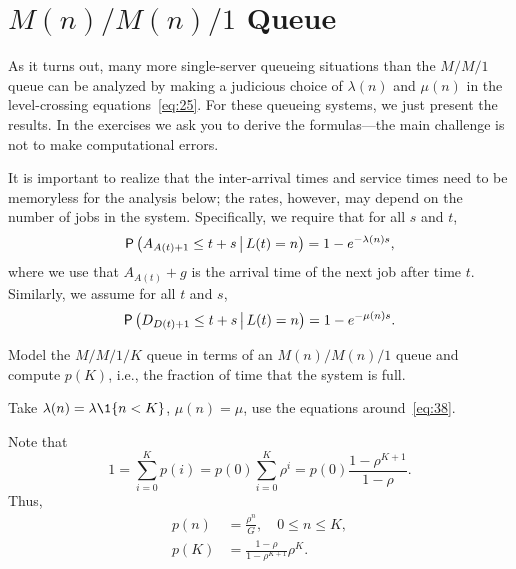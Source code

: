 \section
{$M(n)/M(n)/1$ Queue}
\label{sec:mnmn1}



As it turns out, many more single-server queueing situations than the $M/M/1$ queue can be analyzed by making a judicious choice of $\lambda(n)$ and $\mu(n)$ in the level-crossing equations~\cref{eq:25}.
For these queueing systems, we just present the results.
In the exercises we ask you to derive the formulas---the main challenge is not to make computational errors.

It is important to realize that the inter-arrival times and service times need to be memoryless for the analysis below; the rates, however, may depend on the number of jobs in the system. Specifically, we require that for all $s$ and $t$,
\begin{equation*}
 \P{A_{A(t)+1} \leq t+s \given L(t) = n} = 1-e^{-\lambda(n) s},
\end{equation*}
where we use that $A_{A(t)}+g$ is the arrival time of the next job after time $t$.
Similarly, we assume for all $t$ and $s$,
\begin{equation*}
 \P{D_{D(t)+1} \leq t+s \given L(t)=n} = 1-e^{-\mu(n) s}.
\end{equation*}


\begin{exercise}
 Model the $M/M/1/K$ queue in terms of an $M(n)/M(n)/1$ queue and compute $p(K)$, i.e., the fraction of time that the system is full.
\begin{hint}
 Take $\lambda(n) = \lambda \1{n < K}$, $\mu(n) = \mu$, use the equations around~\cref{eq:38}.
\end{hint}
\begin{solution}
Note that 
\begin{equation*}
1 = \sum_{i=0}^K p(i) = p(0)\sum_{i=0}^K \rho^i = p(0) \frac{1-\rho^{K+1}}{1-\rho}. 
\end{equation*}
Thus,
\begin{subequations}\label{eq:8}
 \begin{align}
p(n) &= \frac{\rho^n}G, \quad 0\leq n \leq K,\\
p(K) &= \frac{1-\rho}{1-\rho^{K+1}} \rho^K.
\end{align}
\end{subequations}
\end{solution}
\end{exercise}

